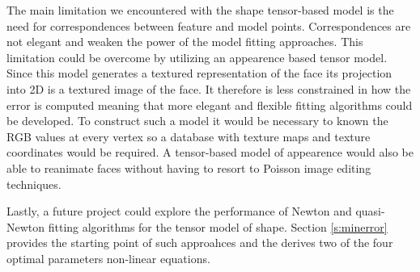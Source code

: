 \documentclass[11pt,a4paper,twoside]{report}
\begin{document}
The main limitation we encountered with the shape tensor-based model is the need for
correspondences between feature and model points. Correspondences are not
elegant and weaken the power of the model fitting approaches. This limitation
could be overcome by utilizing an appearence based tensor model. Since this
model generates a textured representation of the face its projection into
2D is a textured image of the face. It therefore is less constrained in how the
error is computed meaning that more elegant and flexible fitting algorithms
could be developed. To construct such a model it would be necessary to known the
RGB values at every vertex so a database with texture maps and texture
coordinates would be required. A tensor-based model of appearence would also
be able to reanimate faces without having to resort to Poisson image editing
techniques.

Lastly, a future project could explore the performance of Newton and quasi-Newton fitting
algorithms for the tensor model of shape. Section \ref{s:minerror} provides the starting point of such
approahces and the derives two of the four optimal parameters non-linear equations.


\end{document}
